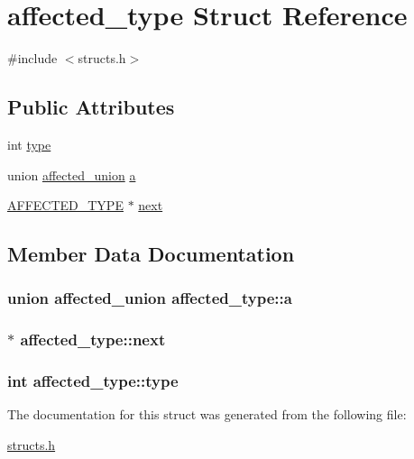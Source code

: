 \hypertarget{structaffected__type}{\section{affected\-\_\-type Struct Reference}
\label{structaffected__type}
}


{\ttfamily \#include $<$structs.\-h$>$}

\subsection*{Public Attributes}
\begin{DoxyCompactItemize}
\item 
int \hyperlink{structaffected__type_a410fb6655c3b2788d44f2e17594f3a0e}{type}
\item 
union \hyperlink{unionaffected__union}{affected\-\_\-union} \hyperlink{structaffected__type_ae1e60182287b8f20b93f1b0964fdde0d}{a}
\item 
\hyperlink{structs_8h_a0a9304fc5764d8448c93fdffdd64e1d2}{A\-F\-F\-E\-C\-T\-E\-D\-\_\-\-T\-Y\-P\-E} $\ast$ \hyperlink{structaffected__type_a6f728ec76b51ae34e134032d9e538bcb}{next}
\end{DoxyCompactItemize}


\subsection{Member Data Documentation}
\hypertarget{structaffected__type_ae1e60182287b8f20b93f1b0964fdde0d}{
\subsubsection[{a}]{\setlength{\rightskip}{0pt plus 5cm}union {\bf affected\-\_\-union} affected\-\_\-type\-::a}}\label{structaffected__type_ae1e60182287b8f20b93f1b0964fdde0d}
\hypertarget{structaffected__type_a6f728ec76b51ae34e134032d9e538bcb}{
\subsubsection[{next}]{$\ast$ affected\-\_\-type\-::next}}\label{structaffected__type_a6f728ec76b51ae34e134032d9e538bcb}
\hypertarget{structaffected__type_a410fb6655c3b2788d44f2e17594f3a0e}{
\subsubsection[{type}]{\setlength{\rightskip}{0pt plus 5cm}int affected\-\_\-type\-::type}}\label{structaffected__type_a410fb6655c3b2788d44f2e17594f3a0e}


The documentation for this struct was generated from the following file\-:\begin{DoxyCompactItemize}
\item 
\hyperlink{structs_8h}{structs.\-h}\end{DoxyCompactItemize}
